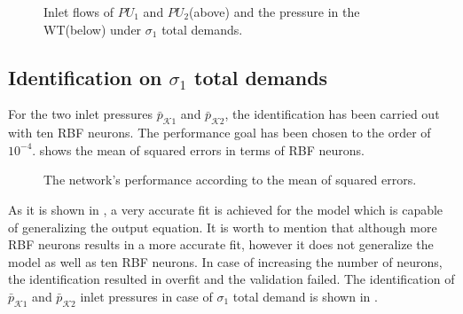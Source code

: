  \vspace{-6.5mm}

 \begin{figure}[H]
 \centering
 \hspace{-4.5mm}
  
 \vspace{-2.5mm}
 \caption{Inlet flows of $PU_1$ and $PU_2$(above) and the pressure in the WT(below) under $\sigma_1$ total demands.}
 \label{fig:WT_sigma1}
 \end{figure}

 \vspace{-3mm}

 \subsection{Identification on $\sigma_1$ total demands}
 \label{identification_sigma1}

For the two inlet pressures $\bar{p}_{\mathcal{K}1}$ and $\bar{p}_{\mathcal{K}2}$, the identification has been carried out with ten RBF neurons. The performance goal has been chosen to the order of $10^{-4}$.  shows the mean of squared errors in terms of RBF neurons. 

 \begin{figure}[H]
 \centering
  
 \vspace{-2.5mm}
 \caption{The network’s performance according to the mean of squared errors.}
 \label{fig:MSE_output}
 \end{figure}

 \vspace{-4mm}

As it is shown in , a very accurate fit is achieved for the model which is capable of generalizing the output equation. It is worth to mention that although more RBF neurons results in a more accurate fit, however it does not generalize the model as well as ten RBF neurons. In case of increasing the number of neurons, the identification resulted in overfit and the validation failed. The identification of $\bar{p}_{\mathcal{K}1}$ and $\bar{p}_{\mathcal{K}2}$ inlet pressures in case of $\sigma_1$ total demand is shown in .

\vspace{-2mm}

